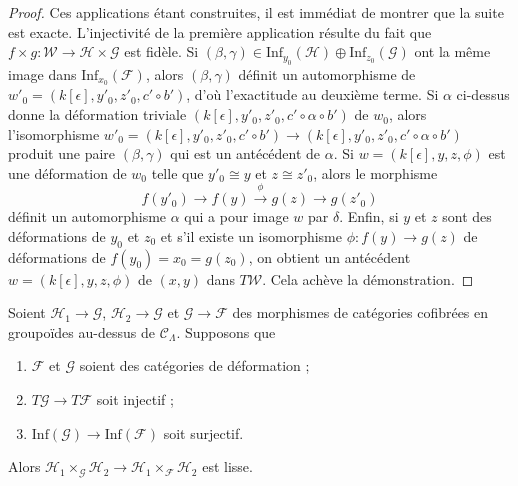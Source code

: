\begin{proof}
\medskip\noindent
Ces applications étant construites, il est immédiat de montrer que la suite
est exacte. L'injectivité de la première application résulte du fait que
$f \times g : \mathcal{W} \to \mathcal{H} \times \mathcal{G}$ est fidèle. Si
$(\beta, \gamma) \in
\text{Inf}_{y_0}(\mathcal{H}) \oplus \text{Inf}_{z_0}(\mathcal{G})$
ont la même image dans $\text{Inf}_{x_0}(\mathcal{F})$, alors
$(\beta, \gamma)$ définit un automorphisme de
$w'_0 = (k[\epsilon], y'_0, z'_0, c' \circ b')$, d'où l'exactitude au
deuxième terme. Si $\alpha$ ci-dessus donne la déformation triviale
$(k[\epsilon], y'_0, z'_0, c' \circ \alpha \circ b')$
de $w_0$, alors l'isomorphisme
$w'_0 = (k[\epsilon], y'_0, z'_0, c' \circ b') \to
(k[\epsilon], y'_0, z'_0, c' \circ \alpha \circ b')$
produit une paire $(\beta, \gamma)$ qui est un antécédent de $\alpha$. Si
$w = (k[\epsilon], y, z, \phi)$ est une déformation de $w_0$ telle que
$y'_0 \cong y$ et $z \cong z'_0$, alors le morphisme
$$
f(y'_0) \to f(y) \xrightarrow{\phi} g(z) \to g(z'_0)
$$
définit un automorphisme $\alpha$ qui a pour image $w$ par $\delta$.
Enfin, si $y$ et $z$ sont des déformations de $y_0$ et $z_0$ et s'il existe un isomorphisme
$\phi : f(y) \to g(z)$ de déformations de
$f(y_0) = x_0 = g(z_0)$, on obtient un antécédent
$w = (k[\epsilon], y, z, \phi)$ de $(x, y)$ dans $T\mathcal{W}$. Cela achève
la démonstration.
\end{proof}

\begin{lemma}
\label{lemma-map-fibre-products-smooth}
Soient $\mathcal{H}_1 \to \mathcal{G}$, $\mathcal{H}_2 \to \mathcal{G}$ et
$\mathcal{G} \to \mathcal{F}$ des morphismes de catégories cofibrées en
groupoïdes au-dessus de $\mathcal{C}_\Lambda$. Supposons que
\begin{enumerate}
\item $\mathcal{F}$ et $\mathcal{G}$ soient des catégories de déformation ;
\item $T\mathcal{G} \to T\mathcal{F}$ soit injectif ;
\item $\text{Inf}(\mathcal{G}) \to \text{Inf}(\mathcal{F})$ soit surjectif.
\end{enumerate}
Alors $\mathcal{H}_1 \times_\mathcal{G} \mathcal{H}_2 \to
\mathcal{H}_1 \times_\mathcal{F} \mathcal{H}_2$ est lisse.
\end{lemma}

